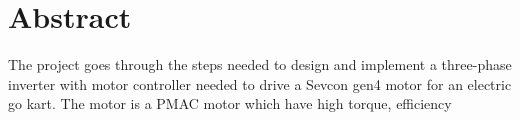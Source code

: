 \section{Abstract}

The project goes through the steps needed to design and implement a three-phase inverter with motor controller needed to drive a Sevcon gen4 motor for an electric go kart. 
The motor is a PMAC motor which have high torque, efficiency 